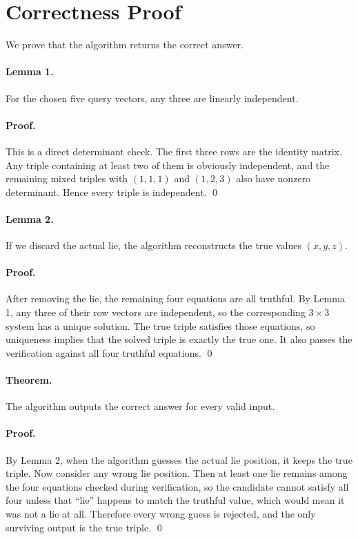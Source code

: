 \documentclass[11pt]{article}
\begin{document}
\section*{Correctness Proof}

We prove that the algorithm returns the correct answer.

\paragraph{Lemma 1.}
For the chosen five query vectors, any three are linearly independent.

\paragraph{Proof.}
This is a direct determinant check. The first three rows are the identity matrix. Any triple containing at
least two of them is obviously independent, and the remaining mixed triples with $(1,1,1)$ and
$(1,2,3)$ also have nonzero determinant. Hence every triple is independent. \qed

\paragraph{Lemma 2.}
If we discard the actual lie, the algorithm reconstructs the true values $(x,y,z)$.

\paragraph{Proof.}
After removing the lie, the remaining four equations are all truthful. By Lemma 1, any three of their row
vectors are independent, so the corresponding $3 \times 3$ system has a unique solution. The true triple
satisfies those equations, so uniqueness implies that the solved triple is exactly the true one. It also
passes the verification against all four truthful equations. \qed

\paragraph{Theorem.}
The algorithm outputs the correct answer for every valid input.

\paragraph{Proof.}
By Lemma 2, when the algorithm guesses the actual lie position, it keeps the true triple. Now consider any
wrong lie position. Then at least one lie remains among the four equations checked during verification, so
the candidate cannot satisfy all four unless that ``lie'' happens to match the truthful value, which would
mean it was not a lie at all. Therefore every wrong guess is rejected, and the only surviving output is the
true triple. \qed
\end{document}
